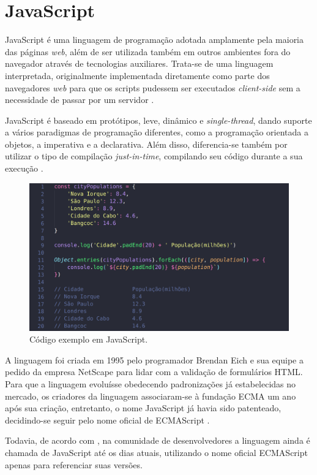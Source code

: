 \section{JavaScript}
\label{sec:javascript}
JavaScript é uma linguagem de programação adotada amplamente pela maioria das páginas \textit{web}, além de ser utilizada também em outros ambientes fora do navegador através de tecnologias auxiliares. Trata-se de uma linguagem interpretada, originalmente implementada diretamente como parte dos navegadores \textit{web} para que os scripts pudessem ser executados \textit{client-side} sem a necessidade de passar por um servidor \cite{Mozilla2023}.

JavaScript é baseado em protótipos, leve, dinâmico e \textit{single-thread}, dando suporte a vários paradigmas de programação diferentes, como a programação orientada a objetos, a imperativa e a declarativa. Além disso, diferencia-se também por utilizar o tipo de compilação \textit{just-in-time}, compilando seu código durante a sua execução \cite{Mozilla2023}.

\begin{figure}[H]
    \centering
    \caption{Código exemplo em JavaScript.}
    \label{fig:javascript}
    \includegraphics[width=.65\textwidth]{data/figures/javascript.png}
\end{figure}

A linguagem foi criada em 1995 pelo programador Brendan Eich e sua equipe a pedido da empresa NetScape para lidar com a validação de formulários HTML. Para que a linguagem evoluísse obedecendo padronizações já estabelecidas no mercado, os criadores da linguagem associaram-se à fundação ECMA um ano após sua criação, entretanto, o nome JavaScript já havia sido patenteado, decidindo-se seguir pelo nome oficial de ECMAScript \cite{Malavasi2017}.

Todavia, de acordo com , na comunidade de desenvolvedores a linguagem ainda é chamada de JavaScript até os dias atuais, utilizando o nome oficial ECMAScript apenas para referenciar suas versões.